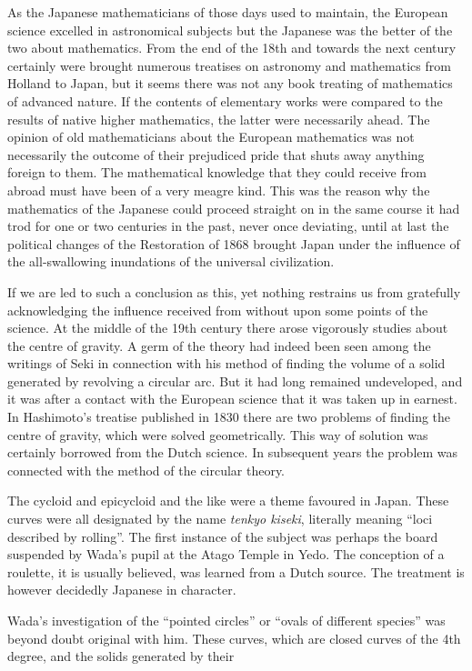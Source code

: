 \documentclass[11pt]{article}
\newcommand{\scanpage}[2]{\clearpage\setcounter{footnote}{0}\noindent{\footnotesize\color{gray}PDF page #1 · #2}\par\medskip}
\newcommand{\scanfooter}{}
\begin{document}
\scanpage{0189}{Chapter 22, printed page 175}
As the Japanese mathematicians of those days used to maintain, the European science excelled in astronomical subjects but the Japanese was the better of the two about mathematics. From the end of the 18th and towards the next century certainly were brought numerous treatises on astronomy and mathematics from Holland to Japan, but it seems there was not any book treating of mathematics of advanced nature. If the contents of elementary works were compared to the results of native higher mathematics, the latter were necessarily ahead. The opinion of old mathematicians about the European mathematics was not necessarily the outcome of their prejudiced pride that shuts away anything foreign to them. The mathematical knowledge that they could receive from abroad must have been of a very meagre kind. This was the reason why the mathematics of the Japanese could proceed straight on in the same course it had trod for one or two centuries in the past, never once deviating, until at last the political changes of the Restoration of 1868 brought Japan under the influence of the all-swallowing inundations of the universal civilization.

If we are led to such a conclusion as this, yet nothing restrains us from gratefully acknowledging the influence received from without upon some points of the science. At the middle of the 19th century there arose vigorously studies about the centre of gravity. A germ of the theory had indeed been seen among the writings of Seki in connection with his method of finding the volume of a solid generated by revolving a circular arc. But it had long remained undeveloped, and it was after a contact with the European science that it was taken up in earnest. In Hashimoto's treatise published in 1830 there are two problems of finding the centre of gravity, which were solved geometrically. This way of solution was certainly borrowed from the Dutch science. In subsequent years the problem was connected with the method of the circular theory.

The cycloid and epicycloid and the like were a theme favoured in Japan. These curves were all designated by the name \emph{tenkyo kiseki}, literally meaning ``loci described by rolling''. The first instance of the subject was perhaps the board suspended by Wada's pupil at the Atago Temple in Yedo. The conception of a roulette, it is usually believed, was learned from a Dutch source. The treatment is however decidedly Japanese in character.

Wada's investigation of the ``pointed circles'' or ``ovals of different species'' was beyond doubt original with him. These curves, which are closed curves of the 4th degree, and the solids generated by their
\scanfooter
\end{document}
